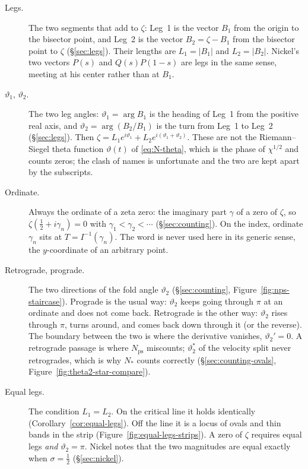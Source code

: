 \documentclass[11pt]{article}
\theoremstyle{definition}
\begin{document}
\begin{description}
\item[Legs.]
The two segments that add to $\zeta$: Leg~1 is the vector $B_1$
from the origin to the bisector point, and Leg~2 is the vector
$B_2=\zeta-B_1$ from the bisector point to $\zeta$
(\S\ref{sec:legs}).
Their lengths are $L_1=|B_1|$ and $L_2=|B_2|$.
Nickel's two vectors $P(s)$ and $Q(s)P(1-s)$ are legs in the same
sense, meeting at his center rather than at $B_1$.

\item[$\vartheta_1$, $\vartheta_2$.]
The two leg angles:
$\vartheta_1=\arg B_1$ is the heading of Leg~1 from the positive
real axis, and
$\vartheta_2=\arg(B_2/B_1)$ is the turn from Leg~1 to Leg~2
(\S\ref{sec:legs}).
Then $\zeta=L_1 e^{i\vartheta_1}+L_2 e^{i(\vartheta_1+\vartheta_2)}$.
These are not the Riemann--Siegel theta function $\vartheta(t)$ of
\eqref{eq:N-theta}, which is the phase of $\chi^{1/2}$ and counts
zeros; the clash of names is unfortunate and the two are kept
apart by the subscripts.

\item[Ordinate.]
Always the ordinate of a zeta zero: the imaginary part $\gamma$ of a
zero of $\zeta$, so $\zeta(\tfrac12+i\gamma_n)=0$ with
$\gamma_1<\gamma_2<\cdots$ (\S\ref{sec:counting}).
On the index, ordinate $\gamma_n$ sits at $T=I^{-1}(\gamma_n)$.
The word is never used here in its generic sense, the
$y$-coordinate of an arbitrary point.

\item[Retrograde, prograde.]
The two directions of the fold angle $\vartheta_2$
(\S\ref{sec:counting}, Figure~\ref{fig:nps-staircase}).
Prograde is the usual way: $\vartheta_2$ keeps going through
$\pi$ at an ordinate and does not come back.
Retrograde is the other way: $\vartheta_2$ rises through $\pi$,
turns around, and comes back down through it (or the reverse).
The boundary between the two is where the derivative vanishes,
$\vartheta_2'=0$.
A retrograde passage is where $N_{\mathrm{ps}}$ miscounts;
$\vartheta_2^{\ast}$ of the velocity split never retrogrades, which is
why $N_{\ast}$ counts correctly
(\S\ref{sec:counting-ovals}, Figure~\ref{fig:theta2-star-compare}).

\item[Equal legs.]
The condition $L_1=L_2$.
On the critical line it holds identically
(Corollary~\ref{cor:equal-legs}).
Off the line it is a locus of ovals and thin bands in the strip
(Figure~\ref{fig:equal-legs-strips}).
A zero of $\zeta$ requires equal legs \emph{and} $\vartheta_2=\pi$.
Nickel notes that the two magnitudes are equal exactly when
$\sigma=\tfrac12$ (\S\ref{sec:nickel}).


\end{description}
\end{document}
